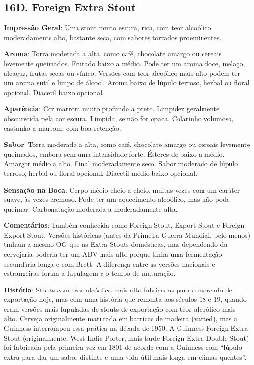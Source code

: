 \subsection*{16D. Foreign Extra Stout}
\textbf{Impressão Geral}: Uma stout muito escura, rica, com teor alcoólico moderadamente alto, bastante seca, com sabores torrados proeminentes.

\textbf{Aroma}: Torra moderada a alta, como café, chocolate amargo ou cereais levemente queimados. Frutado baixo a médio. Pode ter um aroma doce, melaço, alcaçuz, frutas secas ou vínico. Versões com teor alcoólico mais alto podem ter um aroma sutil e limpo de álcool. Aroma baixo de lúpulo terroso, herbal ou floral opcional. Diacetil baixo opcional.

\textbf{Aparência}: Cor marrom muito profundo a preto. Limpidez geralmente obscurecida pela cor escura. Límpida, se não for opaca. Colarinho volumoso, castanho a marrom, com boa retenção.

\textbf{Sabor}: Torra moderada a alta, como café, chocolate amargo ou cereais levemente queimados, embora sem uma intensidade forte. Ésteres de baixo a médio. Amargor médio a alto. Final moderadamente seco. Sabor moderado de lúpulo terroso, herbal ou floral opcional. Diacetil médio-baixo opcional.

\textbf{Sensação na Boca}: Corpo médio-cheio a cheio, muitas vezes com um caráter suave, às vezes cremoso. Pode ter um aquecimento alcoólico, mas não pode queimar. Carbonatação moderada a moderadamente alta.

\textbf{Comentários}: Também conhecida como Foreign Stout, Export Stout e Foreign Export Stout. Versões históricas (antes da Primeira Guerra Mundial, pelo menos) tinham a mesmo OG que as Extra Stouts domésticas, mas dependendo da cervejaria poderia ter um ABV mais alto porque tinha uma fermentação secundária longa e com Brett. A diferença entre as versões nacionais e estrangeiras foram a lupulagem e o tempo de maturação.

\textbf{História}: Stouts com teor alcóolico mais alto fabricadas para o mercado de exportação hoje, mas com uma história que remonta aos séculos 18 e 19, quando eram versões mais lupuladas de stouts de exportação com teor alcoólico mais alto. Cerveja originalmente maturada em barricas de madeira (vatted), mas a Guinness interrompeu essa prática na década de 1950. A Guinness Foreign Extra Stout (originalmente, West India Porter, mais tarde Foreign Extra Double Stout) foi fabricada pela primeira vez em 1801 de acordo com a Guinness com “lúpulo extra para dar um sabor distinto e uma vida útil mais longa em climas quentes”.

